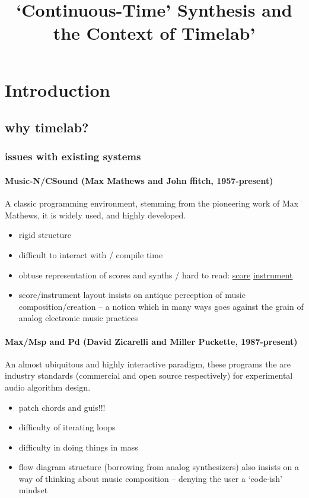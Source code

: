 \documentclass{article}
\begin{document}
\title{`Continuous-Time' Synthesis and the Context of Timelab'}
\maketitle
\section{Introduction}

\subsection{why timelab?}
\subsubsection{issues with existing systems}

\paragraph{Music-N/CSound (Max Mathews and John ffitch, 1957-present)}
A classic programming environment, stemming from the pioneering work of Max Mathews, it is  widely used, and highly developed.
\begin{itemize}
\item rigid structure 
\item difficult to interact with / compile time
\item obtuse representation of scores and synths / hard to read: \href{./score.sco.html}{score} \href{./orc.html}{instrument}
\item score/instrument layout insists on antique perception of music composition/creation -- a notion which in many ways goes against the grain of analog electronic music practices 
\end{itemize} 

\paragraph{Max/Msp and Pd (David Zicarelli and Miller Puckette, 1987-present)}
An almost ubiquitous and highly interactive paradigm, these programs the are industry standards (commercial and open source respectively) for experimental audio algorithm design.
\begin{itemize}
\item patch chords and guis!!!%
\item difficulty of iterating loops%
\item difficulty in doing things in mass
\item flow diagram structure (borrowing from analog synthesizers) also insists on a way of thinking about music composition -- denying the user a `code-ish' mindset
\end{itemize}
\end{document}
